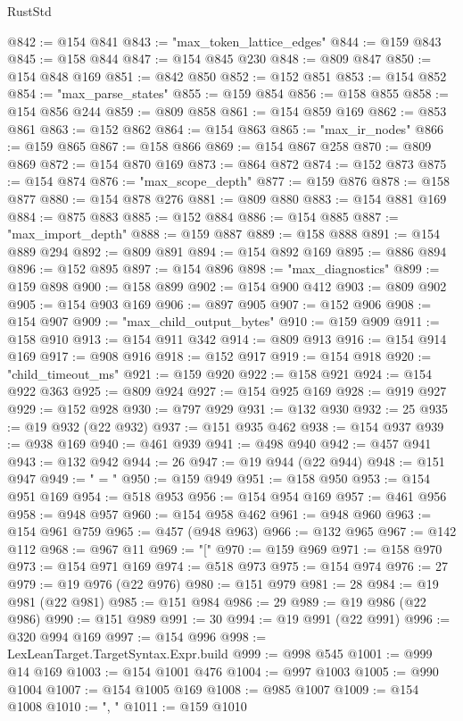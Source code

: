 \begin{lexlean}{RustStd}
\begin{coremodule}
{\begin{coremodule}
{{{{{{{{{{{{{{{{{{{{{{{{{{{{{{{{{{{{{{{{{{{{{{{{{{{{{{{{{{{{{{{{{{{{{{{{{{{{{{{{@842 := @154 @841
@843 := "max_token_lattice_edges"
@844 := @159 @843
@845 := @158 @844
@847 := @154 @845 @230
@848 := @809 @847
@850 := @154 @848 @169
@851 := @842 @850
@852 := @152 @851
@853 := @154 @852
@854 := "max_parse_states"
@855 := @159 @854
@856 := @158 @855
@858 := @154 @856 @244
@859 := @809 @858
@861 := @154 @859 @169
@862 := @853 @861
@863 := @152 @862
@864 := @154 @863
@865 := "max_ir_nodes"
@866 := @159 @865
@867 := @158 @866
@869 := @154 @867 @258
@870 := @809 @869
@872 := @154 @870 @169
@873 := @864 @872
@874 := @152 @873
@875 := @154 @874
@876 := "max_scope_depth"
@877 := @159 @876
@878 := @158 @877
@880 := @154 @878 @276
@881 := @809 @880
@883 := @154 @881 @169
@884 := @875 @883
@885 := @152 @884
@886 := @154 @885
@887 := "max_import_depth"
@888 := @159 @887
@889 := @158 @888
@891 := @154 @889 @294
@892 := @809 @891
@894 := @154 @892 @169
@895 := @886 @894
@896 := @152 @895
@897 := @154 @896
@898 := "max_diagnostics"
@899 := @159 @898
@900 := @158 @899
@902 := @154 @900 @412
@903 := @809 @902
@905 := @154 @903 @169
@906 := @897 @905
@907 := @152 @906
@908 := @154 @907
@909 := "max_child_output_bytes"
@910 := @159 @909
@911 := @158 @910
@913 := @154 @911 @342
@914 := @809 @913
@916 := @154 @914 @169
@917 := @908 @916
@918 := @152 @917
@919 := @154 @918
@920 := "child_timeout_ms"
@921 := @159 @920
@922 := @158 @921
@924 := @154 @922 @363
@925 := @809 @924
@927 := @154 @925 @169
@928 := @919 @927
@929 := @152 @928
@930 := @797 @929
@931 := @132 @930
@932 := 25
@935 := @19 @932 (@22 @932)
@937 := @151 @935 @462
@938 := @154 @937
@939 := @938 @169
@940 := @461 @939
@941 := @498 @940
@942 := @457 @941
@943 := @132 @942
@944 := 26
@947 := @19 @944 (@22 @944)
@948 := @151 @947
@949 := " = "
@950 := @159 @949
@951 := @158 @950
@953 := @154 @951 @169
@954 := @518 @953
@956 := @154 @954 @169
@957 := @461 @956
@958 := @948 @957
@960 := @154 @958 @462
@961 := @948 @960
@963 := @154 @961 @759
@965 := @457 (@948 @963)
@966 := @132 @965
@967 := @142 @112
@968 := @967 @11
@969 := "["
@970 := @159 @969
@971 := @158 @970
@973 := @154 @971 @169
@974 := @518 @973
@975 := @154 @974
@976 := 27
@979 := @19 @976 (@22 @976)
@980 := @151 @979
@981 := 28
@984 := @19 @981 (@22 @981)
@985 := @151 @984
@986 := 29
@989 := @19 @986 (@22 @986)
@990 := @151 @989
@991 := 30
@994 := @19 @991 (@22 @991)
@996 := @320 @994 @169
@997 := @154 @996
@998 := LexLeanTarget.TargetSyntax.Expr.build
@999 := @998 @545
@1001 := @999 @14 @169
@1003 := @154 @1001 @476
@1004 := @997 @1003
@1005 := @990 @1004
@1007 := @154 @1005 @169
@1008 := @985 @1007
@1009 := @154 @1008
@1010 := ", "
@1011 := @159 @1010
}}}}}}}}}}}}}}}}}}}}}}}}}}}}}}}}}}}}}}}}}}}}}}}}}}}}}}}}}}}}}}}}}}}}}}}}}}}}}}}}
\end{coremodule}}
\end{coremodule}
\end{lexlean}
